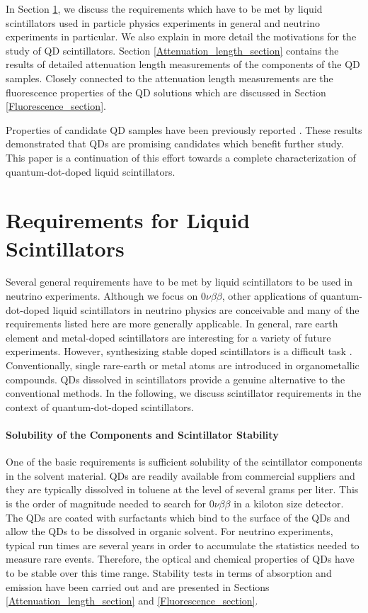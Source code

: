 \documentclass[cits]{JINST}
\begin{document}
In Section \ref{Requirements_section}, we discuss the requirements which have to be met by liquid scintillators used in particle physics experiments in general and neutrino experiments in particular. We also explain in more detail the motivations for the study of QD scintillators. Section \ref{Attenuation_length_section} contains the results of detailed attenuation length measurements of the components of the QD samples. Closely connected to the attenuation length measurements are the fluorescence properties of the QD solutions which are discussed in Section \ref{Fluorescence_section}. 

Properties of candidate QD samples have been previously reported \cite{mitpaper}. These results demonstrated that QDs are promising candidates which benefit further study. This paper is a continuation of this effort towards a complete characterization of quantum-dot-doped liquid scintillators. 


\section{Requirements for Liquid Scintillators}\label{Requirements_section}
Several general requirements have to be met by liquid scintillators to be used in neutrino experiments. Although we focus on 0$\nu\beta\beta$, other applications of quantum-dot-doped liquid scintillators in neutrino physics are conceivable \cite{mitpaper} and many of the requirements listed here are more generally applicable. In general, rare earth element and metal-doped scintillators are interesting for a variety of future experiments. However, synthesizing stable doped scintillators is a difficult task \cite{gd_mpik,chooz,piepke}. Conventionally, single rare-earth or metal atoms are introduced in organometallic compounds. QDs dissolved in scintillators provide a genuine alternative to the conventional methods. In the following, we discuss scintillator requirements in the context of quantum-dot-doped scintillators.  

\paragraph{Solubility of the Components and Scintillator Stability}
One of the basic requirements is sufficient solubility of the scintillator components in the solvent material. QDs are readily available from commercial suppliers and they are typically dissolved in toluene at the level of several grams per liter. This is the order of magnitude needed to search for 0$\nu\beta\beta$ in a kiloton size detector. The QDs are coated with surfactants which bind to the surface of the QDs and allow the QDs to be dissolved in organic solvent. For neutrino experiments, typical run times are several years in order to accumulate the statistics needed to measure rare events. Therefore, the optical and chemical properties of QDs have to be stable over this time range. Stability tests in terms of absorption and emission have been carried out and are presented in Sections \ref{Attenuation_length_section} and \ref{Fluorescence_section}.
\end{document}
